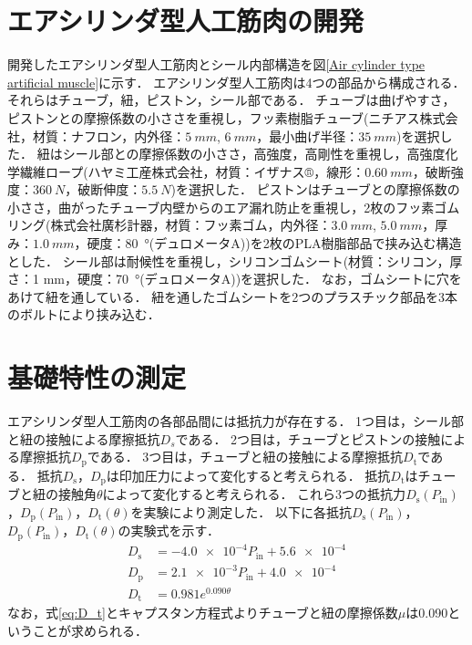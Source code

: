 \section{エアシリンダ型人工筋肉の開発}%
開発したエアシリンダ型人工筋肉とシール内部構造を図\ref{Air cylinder type artificial muscle}に示す．
エアシリンダ型人工筋肉は4つの部品から構成される．
それらはチューブ，紐，ピストン，シール部である．
チューブは曲げやすさ，ピストンとの摩擦係数の小ささを重視し，フッ素樹脂チューブ(ニチアス株式会社，材質：ナフロン\textregistered，内外径：$\SI{5}{mm}$, $\SI{6}{mm}$，最小曲げ半径：$\SI{35}{mm}$)を選択した．
紐はシール部との摩擦係数の小ささ，高強度，高剛性を重視し，高強度化学繊維ロープ(ハヤミ工産株式会社，材質：イザナス®，線形：$\SI{0.60}{mm}$，破断強度：$\SI{360}{N}$，破断伸度：$\SI{5.5}{N}$)を選択した．
ピストンはチューブとの摩擦係数の小ささ，曲がったチューブ内壁からのエア漏れ防止を重視し，2枚のフッ素ゴムリング(株式会社廣杉計器，材質：フッ素ゴム，内外径：$\SI{3.0}{mm}$, $\SI{5.0}{mm}$，厚み：$\SI{1.0}{mm}$，硬度：\SI{80}{\degree}(デュロメータA))を2枚のPLA樹脂部品で挟み込む構造とした．
シール部は耐候性を重視し，シリコンゴムシート(材質：シリコン，厚さ：1 mm，硬度：\SI{70}{\degree}(デュロメータA))を選択した．
なお，ゴムシートに穴をあけて紐を通している．
紐を通したゴムシートを2つのプラスチック部品を3本のボルトにより挟み込む．

\section{基礎特性の測定}%
エアシリンダ型人工筋肉の各部品間には抵抗力が存在する．
1つ目は，シール部と紐の接触による摩擦抵抗$D_s$である．
2つ目は，チューブとピストンの接触による摩擦抵抗$D_\mathrm{p}$である．
3つ目は，チューブと紐の接触による摩擦抵抗$D_\mathrm{t}$である．
抵抗$D_\mathrm{s}$，$D_\mathrm{p}$は印加圧力によって変化すると考えられる．
抵抗$D_\mathrm{t}$はチューブと紐の接触角$\theta$によって変化すると考えられる．
これら3つの抵抗力$D_\mathrm{s}(P_\mathrm{in})$，$D_\mathrm{p}(P_\mathrm{in})$，$D_\mathrm{t}(\theta)$を実験により測定した．
以下に各抵抗$D_\mathrm{s}(P_\mathrm{in})$，$D_\mathrm{p}(P_\mathrm{in})$，$D_\mathrm{t}(\theta)$の実験式を示す．
\begin{align}
  D_\mathrm{s} & = \num{-4.0e-4}P_\mathrm{in} + \num{5.6e-4} \label{eq:D_s} \\
  D_\mathrm{p} & = \num{2.1e-3}P_\mathrm{in} + \num{4.0e-4}  \label{eq:D_p} \\
  D_\mathrm{t} & = 0.981e^{0.090\theta}\label{eq:D_t}
\end{align}
なお，式\eqref{eq:D_t}とキャプスタン方程式よりチューブと紐の摩擦係数$\mu$は0.090ということが求められる．

